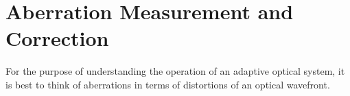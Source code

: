 \section{Aberration Measurement and Correction}


For the purpose of understanding the operation of an adaptive optical system, 
it is best to think of aberrations in terms of distortions of an optical 
wavefront.

